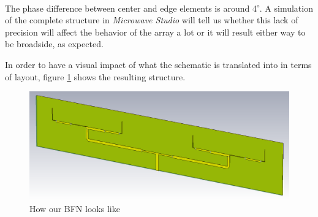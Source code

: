 \par\medskip
\noindent
The phase difference between center and edge elements is around 4\textsuperscript{$\circ$}. A simulation of the complete structure in \textit{Microwave Studio} will tell us whether this lack of precision will affect the behavior of the array a lot or it will result either way to be broadside, as expected.

\par\medskip
\noindent
In order to have a visual impact of what the schematic is translated into in terms of layout, figure \ref{layout} shows the resulting structure.

\begin{figure}[H]
\centering
\includegraphics[scale=0.45]{layout.png}
\caption{How our BFN looks like}
\label{layout}
\end{figure}